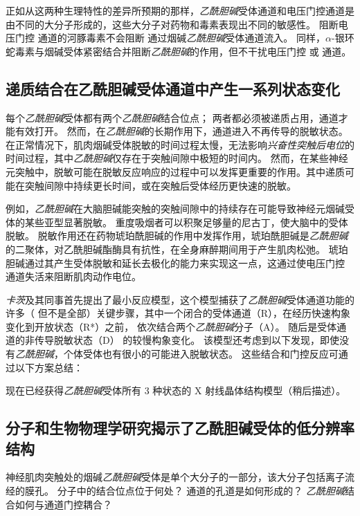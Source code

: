 正如从这两种生理特性的差异所预期的那样，\textit{乙酰胆碱}受体通道和电压门控通道是由不同的大分子形成的，这些大分子对药物和毒素表现出不同的敏感性。
阻断电压门控  通道的河豚毒素不会阻断  通过烟碱\textit{乙酰胆碱}受体通道流入。
同样，$\alpha$-银环蛇毒素与烟碱受体紧密结合并阻断\textit{乙酰胆碱}的作用，但不干扰电压门控  或  通道。



\subsection{递质结合在乙酰胆碱受体通道中产生一系列状态变化}

每个\textit{乙酰胆碱}受体都有两个\textit{乙酰胆碱}结合位点；
两者都必须被递质占用，通道才能有效打开。
然而，在\textit{乙酰胆碱}的长期作用下，通道进入不再传导的脱敏状态。
在正常情况下，肌肉烟碱受体脱敏的时间过程太慢，无法影响\textit{兴奋性突触后电位}的时间过程，其中\textit{乙酰胆碱}仅存在于突触间隙中极短的时间内。
然而，在某些神经元突触中，脱敏可能在脱敏反应响应的过程中可以发挥更重要的作用。其中递质可能在突触间隙中持续更长时间，或在突触后受体经历更快速的脱敏。


例如，\textit{乙酰胆碱}在大脑胆碱能突触的突触间隙中的持续存在可能导致神经元烟碱受体的某些亚型显著脱敏。
重度吸烟者可以积聚足够量的尼古丁，使大脑中的受体脱敏。
脱敏作用还在药物琥珀酰胆碱的作用中发挥作用，琥珀酰胆碱是\textit{乙酰胆碱}的二聚体，对乙酰胆碱酯酶具有抗性，在全身麻醉期间用于产生肌肉松弛。
琥珀胆碱通过其产生受体脱敏和延长去极化的能力来实现这一点，这通过使电压门控  通道失活来阻断肌肉动作电位。


\textit{卡茨}及其同事首先提出了最小反应模型，这个模型捕获了\textit{乙酰胆碱}受体通道功能的许多（ 但不是全部）关键步骤，其中一个闭合的受体通道（R），在经历快速构象变化到开放状态（R*）之前， 依次结合两个\textit{乙酰胆碱}分子（A）。
随后是受体通道的非传导脱敏状态（D） 的较慢构象变化。
该模型还考虑到以下发现，即使没有\textit{乙酰胆碱}，个体受体也有很小的可能进入脱敏状态。
这些结合和门控反应可通过以下方案总结：


现在已经获得\textit{乙酰胆碱}受体所有 3 种状态的 X 射线晶体结构模型（稍后描述）。



\subsection{分子和生物物理学研究揭示了乙酰胆碱受体的低分辨率结构}

神经肌肉突触处的烟碱\textit{乙酰胆碱}受体是单个大分子的一部分，该大分子包括离子流经的膜孔。
分子中的结合位点位于何处？ 通道的孔道是如何形成的？
\textit{乙酰胆碱}结合如何与通道门控耦合？


